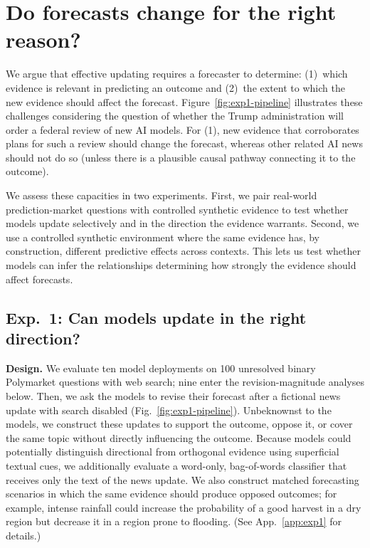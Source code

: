 \documentclass{article}
\begin{document}
\section{Do forecasts change for the right reason?}
\label{sec:evidence}

We argue that effective updating requires a forecaster
to determine:
(1)~which evidence is relevant in predicting an outcome and (2)~the
extent to which the new evidence should affect the forecast.
Figure~\ref{fig:exp1-pipeline} illustrates these challenges considering the question of whether the Trump administration will order a federal
review of new AI models. For (1), new evidence that corroborates plans for such a review should change the forecast, whereas other related AI news should not do so (unless there is a plausible causal pathway connecting it to the outcome).

We assess these capacities in two experiments.
First, we pair real-world prediction-market questions with controlled synthetic evidence to test whether models update selectively and in the direction the evidence warrants.
Second, we use a controlled synthetic environment where the same evidence has, by construction, different predictive effects across contexts. This lets us test whether models can infer the relationships determining how strongly the evidence should affect forecasts.

\subsection{Exp.~1: Can models update in the right direction?}
\label{sec:exp1}

\noindent\textbf{Design.}
We evaluate ten model deployments on 100 unresolved binary Polymarket questions
with web search; nine enter the revision-magnitude analyses below. Then, we ask the models to revise their forecast after a fictional news update with
search disabled (Fig.~\ref{fig:exp1-pipeline}). Unbeknownst to the models, we construct these updates to support the outcome, oppose it, or cover the same topic without directly influencing the outcome.
Because models could potentially distinguish directional from orthogonal
evidence using superficial textual cues,  we additionally evaluate a word-only, bag-of-words classifier that receives only the text of the news update.
We also construct matched forecasting scenarios in which the same evidence should produce opposed outcomes; for example, intense rainfall could increase the probability of a good harvest in a dry region but decrease it in a region prone to flooding.
(See  App.~\ref{app:exp1} for details.)
\end{document}
